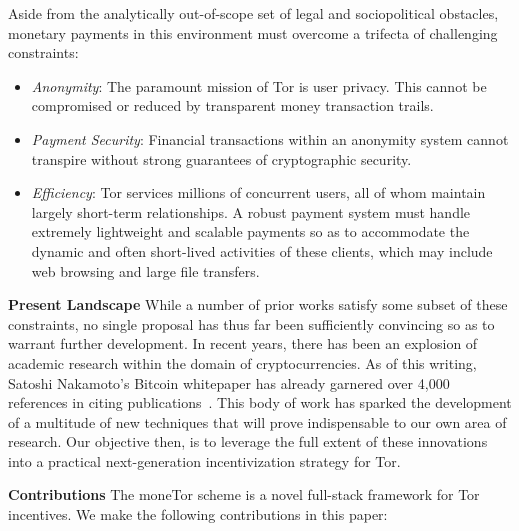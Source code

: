 Aside from the analytically out-of-scope set of legal and
sociopolitical obstacles, monetary payments in this environment must overcome a
trifecta of challenging constraints:

\begin{itemize}
\item \emph{Anonymity}: The paramount mission of Tor is user privacy. This
  cannot be compromised or reduced by transparent money transaction trails.
\item \emph{Payment Security}: Financial transactions within an anonymity system cannot transpire
  without strong guarantees of cryptographic security.
\item \emph{Efficiency}: Tor services millions of concurrent users, all of whom
  maintain largely short-term relationships. A robust payment system must handle
  extremely lightweight and scalable payments so as to accommodate the dynamic
  and often short-lived activities of these clients, which may include web
  browsing and large file transfers.
\end{itemize}

\textbf{Present Landscape} While a number of prior works satisfy some subset of
these constraints, no single proposal has thus far been sufficiently convincing
so as to warrant further development. 
In recent years, there has been an explosion of academic
research within the domain of cryptocurrencies. As of this writing, Satoshi
Nakamoto's Bitcoin whitepaper has already garnered over 4,000 references in
citing publications~\cite{nakamoto2008bitcoin}.  
  This body of work has sparked the development of a multitude of
new techniques that will prove indispensable to our own area of research. Our
objective then, is to leverage the full extent of these innovations into a
practical next-generation incentivization strategy for Tor.

\label{sec:Contributions}
\textbf{Contributions} The moneTor scheme is a novel full-stack framework for
Tor incentives. We make the following contributions in this paper:


